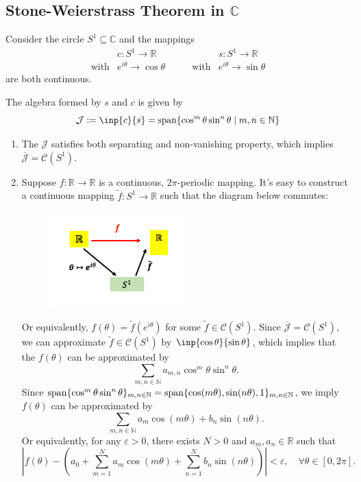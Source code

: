 \subsection{Stone-Weierstrass Theorem in $\mathbb{C}$}

Consider the circle $S^1\subseteq\mathbb{C}$ and the mappings
\[
\begin{array}{ll}
&c:S^1\to\mathbb{R}\\
\text{with}&e^{i\theta}\to\cos\theta
\end{array}\qquad
\begin{array}{ll}
&s:S^1\to\mathbb{R}\\
\text{with}&e^{i\theta}\to\sin\theta
\end{array}
\]
are both continuous.

The algebra formed by $s$ and $c$ is given by
\[
\mathcal{J}:=\inp{c}{s}=\Span\{\cos^m\theta \sin^n\theta\mid m,n\in\mathbb{N}\}
\]
\begin{enumerate}
\item
The $\mathcal{J}$ satisfies both separating and non-vanishing property, which implies $\overline{\mathcal{J}} = \mathcal{C}(S^1)$.
\item
Suppose $f:\mathbb{R}\to\mathbb{R}$ is a continuous, $2\pi$-periodic mapping. It's easy to construct a continuous mapping $\tilde f:S^1\to\mathbb{R}$ such that the diagram below commutes:
\begin{figure}[H]
\centering
\includegraphics[width=0.5\textwidth]{week5/p_2}
\end{figure}
Or equivalently, $f(\theta) = \tilde{f}(e^{i\theta})$ for some $\tilde{f}\in\mathcal{C}(S^1)$.
Since $\overline{\mathcal{J}} = \mathcal{C}(S^1)$, we can approximate $\tilde{f}\in\mathcal{C}(S^1)$ by $\inp{\cos\theta}{\sin\theta}$, which implies that the $f(\theta)$ can be approximated by
\[
\sum_{m,n\in\mathbb{N}}a_{m,n}\cos^m\theta\sin^n\theta.
\]
Since $\operatorname{span}\{\cos^m\theta\sin^n\theta\}_{m,n\in\mathbb{N}} = \operatorname{span}\{\cos(m\theta),\sin(n\theta),1\}_{m,n\in\mathbb{N}}$, we imply $f(\theta)$ can be approximated by
\[
\sum_{m,n\in\mathbb{N}}a_m\cos(m\theta)+b_n\sin(n\theta).
\]
Or equivalently, for any $\varepsilon>0$, there exists $N>0$ and $a_m,a_n\in\mathbb{R}$ such that 
\begin{equation}\label{Eq:5:1}
\left|f(\theta) - 
\left(
a_0+\sum_{m=1}^Na_m\cos(m\theta) + \sum_{n=1}^Nb_n\sin(n\theta)
\right)
\right|<\varepsilon,\quad
\forall\theta\in[0,2\pi].
\end{equation}
\end{enumerate}
